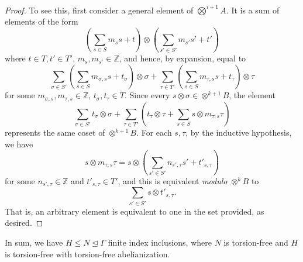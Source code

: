 \documentclass[12pt,reqno]{article}
\numberwithin{equation}{section}
\newcommand{\Z}{\mathbb{Z}}
\begin{document}
\begin{proof}
To see this, first consider a general element of $\bigotimes^{i+1} A$. It is a sum of elements of the form
\[ 
   (\sum_{s \in S} m_s s + t) \otimes (\sum_{s' \in S'} m_{s'} s' + t')
\]
where $t \in T, t' \in T'$, $m_s, m_{s'} \in \Z$,
and hence, by expansion, equal to 
\[
   \sum_{\sigma \in S'} ( \sum_{s \in S} m_{\sigma, s} s + t_{\sigma} ) \otimes \sigma +
   \sum_{\tau \in T'} ( \sum_{s \in S} m_{\tau, s} s + t_{\tau} ) \otimes \tau
\]
for some $m_{\sigma, s}, m_{\tau, s} \in \Z$, $t_{\sigma}, t_{\tau} \in T$.
Since every $s \otimes \sigma \in \otimes^{k+1} B$, the element
\[
   \sum_{\sigma \in S'} t_{\sigma} \otimes \sigma + \sum_{\tau \in T'}\left( t_{\tau} \otimes \tau + \sum_{s \in S} s \otimes m_{\tau, s} \tau \right)
\]
represents the same coset of $\otimes^{k+1} B$.
For each $s, \tau$, by the inductive hypothesis, we have
\[ 
   s \otimes m_{\tau,s} \tau = s \otimes \left( \sum_{s' \in S'} n_{s', \tau} s' + t'_{s,\tau} \right)
\]
for some $n_{s',\tau} \in \Z$ and $t'_{s,\tau} \in T'$, and this is equivalent \emph{modulo} $\otimes^k B$ to 
\[
   \sum_{s' \in S'} s \otimes t'_{s,\tau}.
\]
That is, an arbitrary element is equivalent to one in the set provided, as desired.
\end{proof}

In sum, we have $H \le N \unlhd \Gamma$ finite index inclusions, where $N$ is torsion-free and $H$ is torsion-free with torsion-free abelianization.
\end{document}
